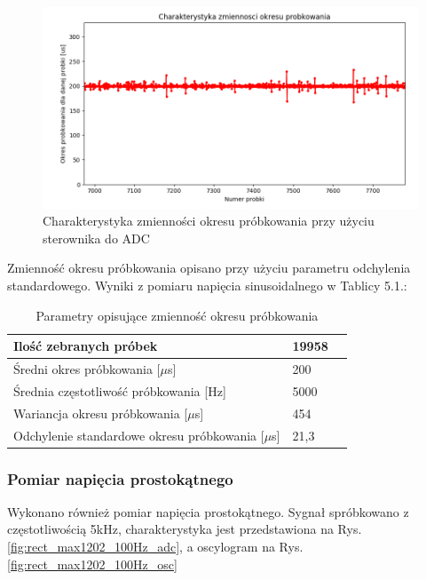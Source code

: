\begin{figure}[h]
	\centering
		\includegraphics[width=14cm]{zmiennosc_probkowania_max1202}
	\caption{Charakterystyka zmienności okresu próbkowania przy użyciu sterownika do ADC} 
	\label{fig:zmiennosc_probkowania_max1202}
\end{figure}

Zmienność okresu próbkowania opisano przy użyciu parametru odchylenia standardowego. Wyniki z pomiaru napięcia sinusoidalnego w Tablicy 5.1.:

\begin{table}[t]
\label{tab5.1}
\centering
\begin{tabular}{|l|l|l|}
  \hline 
  Ilość zebranych próbek & 19958 \\
  \hline
  Średni okres próbkowania [$\mu$s] & 200 \\
  \hline
  Średnia częstotliwość próbkowania [Hz]& 5000 \\
  \hline 
  Wariancja okresu próbkowania [$\mu$s]  & 454 \\
  \hline
  Odchylenie standardowe okresu próbkowania [$\mu$s] & 21,3 \\
  \hline

  
\end{tabular}
\caption{Parametry opisujące zmienność okresu próbkowania} 
\end{table}


\subsubsection{Pomiar napięcia prostokątnego}

Wykonano również pomiar napięcia prostokątnego. Sygnał spróbkowano z częstotliwością 5kHz, charakterystyka jest przedstawiona na Rys. \ref{fig:rect_max1202_100Hz_adc}, a oscylogram na Rys. \ref{fig:rect_max1202_100Hz_osc} 

